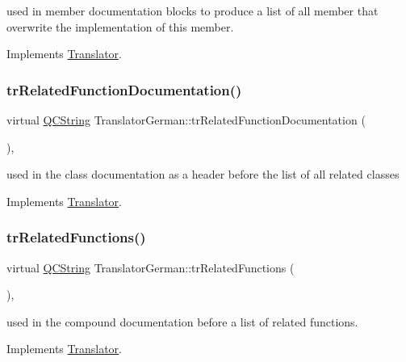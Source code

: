 used in member documentation blocks to produce a list of all member that overwrite the implementation of this member. 

Implements \mbox{\hyperlink{class_translator}{Translator}}.

\mbox{\label{class_translator_german_a3e5b7ad16e763da09af035ba68667406}} 
\subsubsection{\texorpdfstring{trRelatedFunctionDocumentation()}{trRelatedFunctionDocumentation()}}
{\footnotesize\ttfamily virtual \mbox{\hyperlink{class_q_c_string}{Q\+C\+String}} Translator\+German\+::tr\+Related\+Function\+Documentation (\begin{DoxyParamCaption}{ }\end{DoxyParamCaption})\hspace{0.3cm}{\ttfamily [inline]}, {\ttfamily [virtual]}}

used in the class documentation as a header before the list of all related classes 

Implements \mbox{\hyperlink{class_translator}{Translator}}.

\mbox{\label{class_translator_german_a8493f1dd1cc2fbf5dd164b84387282f7}} 
\subsubsection{\texorpdfstring{trRelatedFunctions()}{trRelatedFunctions()}}
{\footnotesize\ttfamily virtual \mbox{\hyperlink{class_q_c_string}{Q\+C\+String}} Translator\+German\+::tr\+Related\+Functions (\begin{DoxyParamCaption}{ }\end{DoxyParamCaption})\hspace{0.3cm}{\ttfamily [inline]}, {\ttfamily [virtual]}}

used in the compound documentation before a list of related functions. 

Implements \mbox{\hyperlink{class_translator}{Translator}}.

